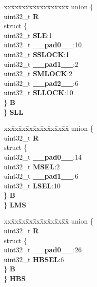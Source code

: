 \begin{DoxyCompactItemize}
\begin{tabbing}
\end{tabbing}\item 
\mbox{\label{structFLASH__tag_a643e3e71150df480b892c7d3ecc75258}} 
\begin{tabbing}
xx\=xx\=xx\=xx\=xx\=xx\=xx\=xx\=xx\=\kill
union \{\\
\>uint32\_t {\bfseries R}\\
\>struct \{\\
\>\>uint32\_t {\bfseries SLE}:1\\
\>\>uint32\_t {\bfseries \_\_pad0\_\_}:10\\
\>\>uint32\_t {\bfseries SSLOCK}:1\\
\>\>uint32\_t {\bfseries \_\_pad1\_\_}:2\\
\>\>uint32\_t {\bfseries SMLOCK}:2\\
\>\>uint32\_t {\bfseries \_\_pad2\_\_}:6\\
\>\>uint32\_t {\bfseries SLLOCK}:10\\
\>\} {\bfseries B}\\
\} {\bfseries SLL}\\

\end{tabbing}\item 
\mbox{\label{structFLASH__tag_a7660563adf97d53524b48aa77b84f790}} 
\begin{tabbing}
xx\=xx\=xx\=xx\=xx\=xx\=xx\=xx\=xx\=\kill
union \{\\
\>uint32\_t {\bfseries R}\\
\>struct \{\\
\>\>uint32\_t {\bfseries \_\_pad0\_\_}:14\\
\>\>uint32\_t {\bfseries MSEL}:2\\
\>\>uint32\_t {\bfseries \_\_pad1\_\_}:6\\
\>\>uint32\_t {\bfseries LSEL}:10\\
\>\} {\bfseries B}\\
\} {\bfseries LMS}\\

\end{tabbing}\item 
\mbox{\label{structFLASH__tag_af0c8574834c32d39031f94b513c68e82}} 
\begin{tabbing}
xx\=xx\=xx\=xx\=xx\=xx\=xx\=xx\=xx\=\kill
union \{\\
\>uint32\_t {\bfseries R}\\
\>struct \{\\
\>\>uint32\_t {\bfseries \_\_pad0\_\_}:26\\
\>\>uint32\_t {\bfseries HBSEL}:6\\
\>\} {\bfseries B}\\
\} {\bfseries HBS}\\


\end{tabbing}
\end{DoxyCompactItemize}
